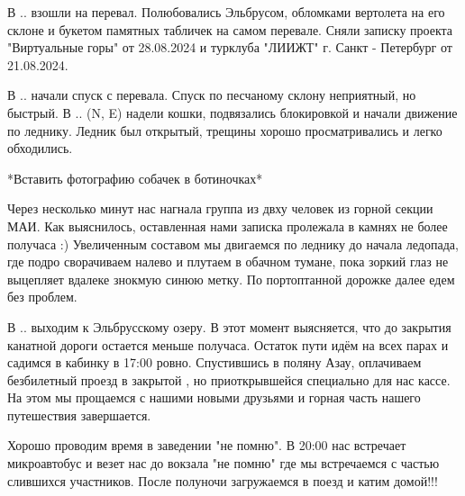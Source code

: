 В .. взошли на перевал. Полюбовались Эльбрусом, обломками вертолета на его склоне и букетом памятных табличек на самом перевале. Сняли записку проекта "Виртуальные горы" от 28.08.2024 и турклуба "ЛИИЖТ" г. Санкт - Петербург от 21.08.2024.

В .. начали спуск с перевала. Спуск по песчаному склону неприятный, но быстрый. В .. (N, E) надели кошки, подвязались блокировкой и начали движение по леднику. Ледник был открытый, трещины хорошо просматривались и легко обходились.

*Вставить фотографию собачек в ботиночках*

Через несколько минут нас нагнала группа из двху человек из горной секции МАИ. Как выяснилось, оставленная нами записка пролежала в камнях не более получаса :) Увеличенным составом мы двигаемся по леднику до начала ледопада, где подро сворачиваем налево и плутаем в обачном тумане, пока зоркий глаз не выцепляет вдалеке знокмую синюю метку. По портоптанной дорожке далее едем без проблем. 

В .. выходим к Эльбрусскому озеру. В этот момент выясняется, что до закрытия канатной дороги остается меньше получаса. Остаток пути идём на всех парах и садимся в кабинку в 17:00 ровно. Спустившись в поляну Азау, оплачиваем безбилетный проезд в закрытой , но приоткрывшейся специально для нас кассе. На этом мы прощаемся с нашими новыми друзьями и горная часть нашего путешествия завершается.

Хорошо проводим время в заведении "не помню". В 20:00 нас встречает микроавтобус и везет нас до вокзала "не помню" где мы встречаемся с частью слившихся участников. После полуночи загружаемся в поезд и катим домой!!!







\clearpage